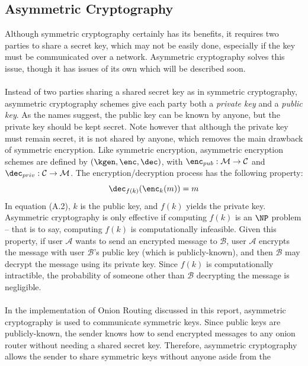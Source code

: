 \documentclass[10pt]{report}
\begin{document}
\begin{appendix}
    \section{Asymmetric Cryptography}
    Although symmetric cryptography certainly has its benefits, it requires two parties to share a
    secret key, which may not be easily done, especially if the key must be communicated over a
    network. Asymmetric cryptography solves this issue, though it has issues of its own which will
    be described soon.\\\\
    Instead of two parties sharing a shared secret key as in symmetric cryptography, asymmetric
    cryptography schemes give each party both a \textit{private key} and a \textit{public key}. As
    the names suggest, the public key can be known by anyone, but the private key should be kept
    secret. Note however that although the private key must remain secret, it is not shared by
    anyone, which removes the main drawback of symmetric encryption. Like symmetric encryption,
    asymmetric encryption schemes are defined by $(\kgen,\enc,\dec)$, with
    $\enc_{pub}:\mathcal{M}\rightarrow\mathcal{C}$ and
    $\dec_{priv}:\mathcal{C}\rightarrow\mathcal{M}$. The encryption/decryption process has the
    following property:
    \begin{equation}
        \dec_{f(k)}(\enc_{k}(m)) = m
    \end{equation}
    In equation (A.2), $k$ is the public key, and $f(k)$ yields the private key. Asymmetric
    cryptography is only effective if computing $f(k)$ is an $\NP$ problem -- that is to say,
    computing $f(k)$ is computationally infeasible. Given this property, if user $\mathcal{A}$ wants
    to send an encrypted message to $\mathcal{B}$, user $\mathcal{A}$ encrypts the message with user
    $\mathcal{B}$'s public key (which is publicly-known), and then $\mathcal{B}$ may decrypt the
    message using its private key. Since $f(k)$ is computationally intractible, the probability of
    someone other than $\mathcal{B}$ decrypting the message is negligible.\\\\
    In the implementation of Onion Routing discussed in this report, asymmetric cryptography is used
    to communicate symmetric keys. Since public keys are publicly-known, the sender knows how to
    send encrypted messages to any onion router without needing a shared secret key. Therefore,
    asymmetric cryptography allows the sender to share symmetric keys without anyone aside from the

\end{appendix}
\end{document}

